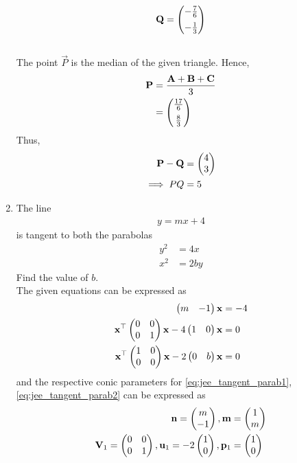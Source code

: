 \documentclass[journal,12pt,twocolumn]{IEEEtran}
\renewcommand\thesection{\arabic{section}}
\begin{document}
\begin{enumerate}[label=\thesection.\arabic*.,ref=\thesection.\theenumi]
\begin{align}
	\mathbf{Q} = 	\begin{pmatrix}-\frac{7}{6}\\[0.5em] -\frac{1}{3} \end{pmatrix} 
\end{align}
\\
\solution 
The point $\vec{P}$ is the median of the given triangle.  Hence, 
\begin{align}
	\mathbf{P} &= 	\frac{\mathbf{A}+\mathbf{B}+\mathbf{C}}{3}
	\\
	&= \begin{pmatrix}\frac{17}{6} \\[0.5em] \frac{8}{3}\end{pmatrix}
\end{align}
Thus, 
\begin{align}
	\mathbf{P}-\mathbf{Q} &= 	\begin{pmatrix}4\\3\end{pmatrix}
	\\
	\implies PQ &= 5
\end{align}
	\item The line 
\begin{align}
	y = mx+4
\end{align}
is  tangent to both the parabolas
\begin{align}
	y^2&=4x
	\\
	x^2&=2by
\end{align}
Find the value of $b$.
\\
\solution The given equations can be expressed as
\begin{align}
	\label{eq:jee_tangent}
	\begin{pmatrix}m & -1\end{pmatrix}\mathbf{x} &= -4
	\\
	\label{eq:jee_tangent_parab1}
	\mathbf{x}^{\top}\begin{pmatrix}0 & 0 \\ 0 &  1\end{pmatrix}\mathbf{x} - 4 \begin{pmatrix}1 & 0\end{pmatrix}\mathbf{x}&= 0
	\\
	\label{eq:jee_tangent_parab2}
	\mathbf{x}^{\top}\begin{pmatrix}1 & 0 \\ 0  & 0\end{pmatrix}\mathbf{x} - 2 \begin{pmatrix}0 & b\end{pmatrix}\mathbf{x}&= 0
\end{align}
and the respective conic parameters for 
	\eqref{eq:jee_tangent_parab1},
	\eqref{eq:jee_tangent_parab2}
	can be expressed as
\begin{align}
	\label{eq:jee_tangent_dir}
	\vec{n} = 	\myvec{m \\ -1},
	\vec{m} &= 	\myvec{1 \\ m}
	\\
	\label{eq:jee_tangent_parab1_param}
	\vec{V}_1 =\myvec{0 & 0 \\ 0 &  1}, \vec{u}_1 = - 2 \myvec{1 \\ 0},\vec{p}_1 &=  \myvec{1 \\ 0}
	\\
	\label{eq:jee_tangent_parab2_param}

\end{align}
\end{enumerate}
\end{document}
